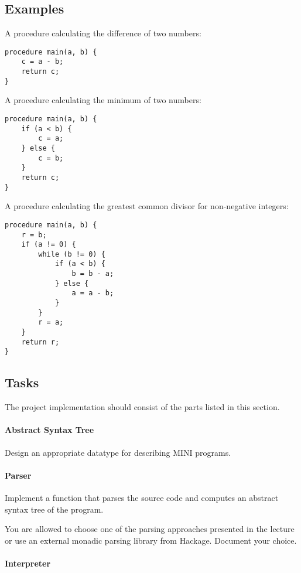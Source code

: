 \documentclass{article}
\begin{document}
\subsection{Examples}

A procedure calculating the difference of two numbers:
\begin{lstlisting}
procedure main(a, b) {
    c = a - b;
    return c;
}
\end{lstlisting}

A procedure calculating the minimum of two numbers:
\begin{lstlisting}
procedure main(a, b) {
    if (a < b) {
        c = a;
    } else {
        c = b;
    }
    return c;
}
\end{lstlisting}

A procedure calculating the greatest common divisor for non-negative integers:

\begin{lstlisting}
procedure main(a, b) {
    r = b;
    if (a != 0) {
        while (b != 0) {
            if (a < b) {
                b = b - a;
            } else {
                a = a - b;
            }
        }
        r = a;
    }
    return r;
}
\end{lstlisting}

\subsection{Tasks}

The project implementation should consist of the parts listed in this section.

\paragraph{Abstract Syntax Tree}

Design an appropriate datatype for describing MINI programs.

\paragraph{Parser}

Implement a function that parses the source code and computes an abstract syntax tree of the program.

You are allowed to choose one of the parsing approaches presented in the lecture or use an external monadic parsing library from Hackage. Document your choice.

\paragraph{Interpreter}
\end{document}
